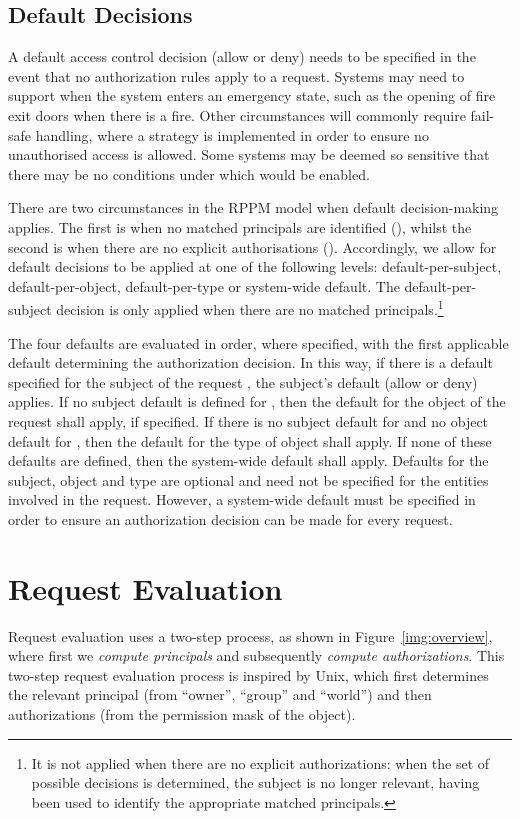 \documentclass{article}
\begin{document}
\subsection{Default Decisions}\label{sec:model:defaults}
A default access control decision (allow or deny) needs to be specified in the event that no authorization rules apply to a request.
Systems may need to support  when the system enters an emergency state, such as the opening of fire exit doors when there is a fire.
Other circumstances will commonly require fail-safe handling, where a  strategy is implemented in order to ensure no unauthorised access is allowed. Some systems may be deemed so sensitive that there may be no conditions under which  would be enabled.

There are two circumstances in the RPPM model when default decision-making applies.
The first is when no matched principals are identified (\mbox{}), whilst the second is when there are no explicit authorisations (\mbox{}).
Accordingly, we allow for default decisions to be applied at one of the following levels: default-per-subject, default-per-object, default-per-type or system-wide default.
The default-per-subject decision is only applied when there are no matched principals.\footnote{It is not applied when there are no explicit authorizations: when the set of possible decisions is determined, the subject is no longer  relevant, having been used to identify the appropriate matched principals.}

The four defaults are evaluated in order, where specified, with the first applicable default determining the authorization decision.
In this way, if there is a default specified for the subject  of the request , the subject's default (allow or deny) applies.
If no subject default is defined for , then the default for the object  of the request shall apply, if specified.
If there is no subject default for  and no object default for , then the default for the type of object  shall apply.
If none of these defaults are defined, then the system-wide default shall apply.
Defaults for the subject, object and type are optional and need not be specified for the entities involved in the request.
However, a system-wide default must be specified in order to ensure an authorization decision can be made for every request.

\section{Request Evaluation}\label{sec:requests}
Request evaluation uses a two-step process, as shown in Figure~\ref{img:overview}, where first we \emph{compute principals} and subsequently \emph{compute authorizations}.
This two-step request evaluation process is inspired by Unix, which first determines the relevant principal (from ``owner'', ``group'' and ``world'') and then authorizations (from the permission mask of the object).
\end{document}
